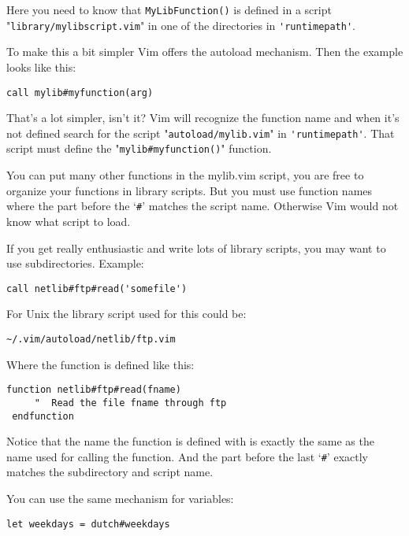Here you need to know that \verb!MyLibFunction()! is defined in a script "\verb!library/mylibscript.vim!" in one of the directories in \verb!'runtimepath'!.

To make this a bit simpler Vim offers the autoload mechanism.
Then the example looks like this:

\begin{Verbatim}[samepage=true]
 call mylib#myfunction(arg)
\end{Verbatim}

That's a lot simpler, isn't it?
Vim will recognize the function name and when it's not defined search for the script "\verb!autoload/mylib.vim!" in \verb!'runtimepath'!.
That script must define the "\verb!mylib#myfunction()!" function.

You can put many other functions in the mylib.vim script, you are free to organize your functions in library scripts.
But you must use function names where the part before the `\verb!#!' matches the script name.
Otherwise Vim would not know what script to load.

If you get really enthusiastic and write lots of library scripts, you may want to use subdirectories.
Example:

\begin{Verbatim}[samepage=true]
 call netlib#ftp#read('somefile')
\end{Verbatim}

For Unix the library script used for this could be:

\begin{Verbatim}[samepage=true]
    ~/.vim/autoload/netlib/ftp.vim
\end{Verbatim}

Where the function is defined like this:

\begin{Verbatim}[samepage=true]
 function netlib#ftp#read(fname)
     "  Read the file fname through ftp
 endfunction
\end{Verbatim}

Notice that the name the function is defined with is exactly the same as the name used for calling the function.
And the part before the last `\verb!#!' exactly matches the subdirectory and script name.

You can use the same mechanism for variables:

\begin{Verbatim}[samepage=true]
 let weekdays = dutch#weekdays
\end{Verbatim}

